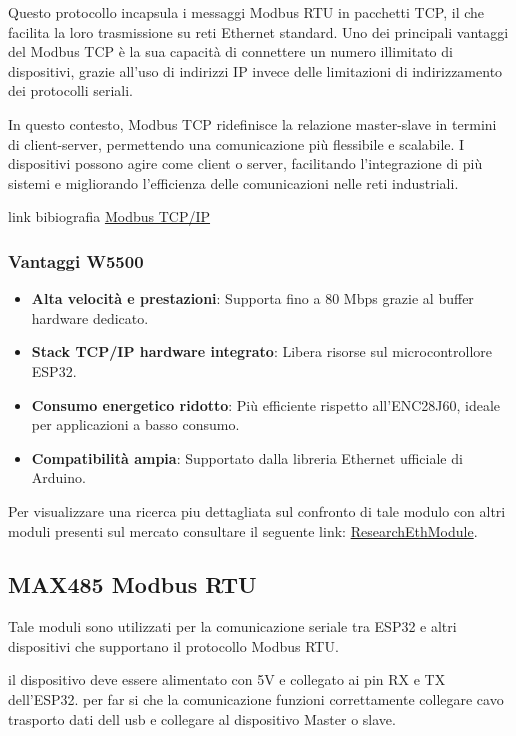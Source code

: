 \documentclass[12pt,a4paper]{report}
\begin{document}
Questo protocollo incapsula i messaggi Modbus RTU in pacchetti TCP, il che facilita la loro trasmissione su reti Ethernet standard. Uno dei principali vantaggi del Modbus TCP è la sua capacità di connettere un numero illimitato di dispositivi, grazie all’uso di indirizzi IP invece delle limitazioni di indirizzamento dei protocolli seriali.

In questo contesto, Modbus TCP ridefinisce la relazione master-slave in termini di client-server, permettendo una comunicazione più flessibile e scalabile. I dispositivi possono agire come client o server, facilitando l’integrazione di più sistemi e migliorando l’efficienza delle comunicazioni nelle reti industriali.

link bibiografia \href{https://v2charge.com/it/che-cose-modbus-rtu-tpc/}{Modbus TCP/IP}

\subsubsection{Vantaggi W5500}
\begin{itemize}
    \item \textbf{Alta velocità e prestazioni}: Supporta fino a 80 Mbps grazie al buffer hardware dedicato.
    \item \textbf{Stack TCP/IP hardware integrato}: Libera risorse sul microcontrollore ESP32.
    \item \textbf{Consumo energetico ridotto}: Più efficiente rispetto all’ENC28J60, ideale per applicazioni a basso consumo.
    \item \textbf{Compatibilità ampia}: Supportato dalla libreria Ethernet ufficiale di Arduino.
\end{itemize}

Per visualizzare una ricerca piu dettagliata sul confronto di tale modulo con altri moduli presenti sul mercato consultare il seguente link: \href{https://github.com/AlessioTommasi-supsi/iotProject/tree/main/docs/ResearchEthModule}{ResearchEthModule}.

\subsection{MAX485 Modbus RTU} 

Tale moduli sono utilizzati per la comunicazione seriale tra ESP32 e altri dispositivi che supportano il protocollo Modbus RTU.

il dispositivo deve essere alimentato con 5V e collegato ai pin RX e TX dell'ESP32.
per far si che la comunicazione funzioni correttamente collegare cavo trasporto dati dell usb e collegare al dispositivo Master o slave.
\end{document}
